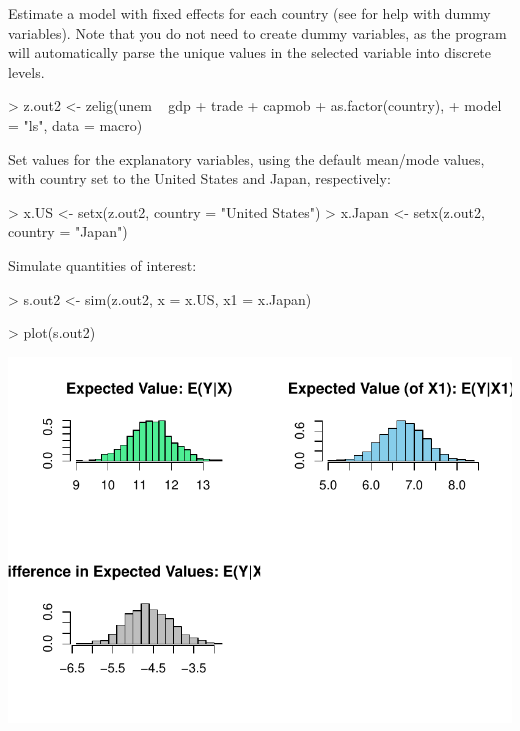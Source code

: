 \begin{enumerate}
Estimate a model with fixed effects for each country (see
 for help with dummy variables).  Note that you do not
need to create dummy variables, as the program will automatically
parse the unique values in the selected variable into discrete levels.  
\begin{Schunk}
\begin{Sinput}
> z.out2 <- zelig(unem ~ gdp + trade + capmob + as.factor(country), 
+     model = "ls", data = macro)
\end{Sinput}
\end{Schunk}
Set values for the explanatory variables, using the default mean/mode
values, with country set to the United States and Japan, respectively:
\begin{Schunk}
\begin{Sinput}
> x.US <- setx(z.out2, country = "United States")
> x.Japan <- setx(z.out2, country = "Japan")
\end{Sinput}
\end{Schunk}
Simulate quantities of interest:
\begin{Schunk}
\begin{Sinput}
> s.out2 <- sim(z.out2, x = x.US, x1 = x.Japan)
\end{Sinput}
\end{Schunk}
\begin{center}
\begin{Schunk}
\begin{Sinput}
> plot(s.out2)
\end{Sinput}
\end{Schunk}
\includegraphics{vigpics/ls-DummyPlot}
\end{center}


\end{enumerate}
